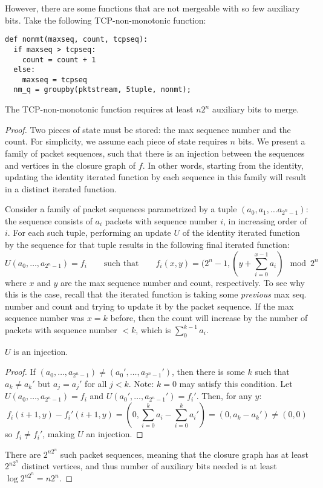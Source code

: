 However, there are some functions that are not mergeable with so few auxiliary bits. Take the following TCP-non-monotonic function:
\begin{verbatim}
def nonmt(maxseq, count, tcpseq):
  if maxseq > tcpseq:
    count = count + 1
  else:
    maxseq = tcpseq
  nm_q = groupby(pktstream, 5tuple, nonmt);
\end{verbatim}

\begin{theorem}
The TCP-non-monotonic function requires at least $n2^n$ auxiliary bits to merge.
\end{theorem}
\begin{proof}
Two pieces of state must be stored: the max sequence number and the count. For simplicity, we assume each piece of state requires $n$ bits.
We present a family of packet sequences, such that there is an injection between the sequences and vertices in the closure graph of $f$. In other words, starting from the identity, updating the identity iterated function by each sequence in this family will result in a distinct iterated function. 

Consider a family of packet sequences parametrized by a tuple $(a_0, a_1, \ldots a_{2^n-1})$: the sequence consists of $a_i$ packets with sequence number $i$, in increasing order of $i$. For each such tuple, performing an update $U$ of the identity iterated function by the sequence for that tuple results in the following final iterated function:
\[ U(a_0, \ldots, a_{2^n-1}) = f_i\quad\quad \text{such that} \quad\quad f_i(x,y) = (2^n - 1, (y + \sum_{i=0}^{x-1} a_i) \mod 2^n \]
where $x$ and $y$ are the max sequence number and count, respectively. To see why this is the case, recall that the iterated function is taking some \emph{previous} max seq. number and count and trying to update it by the packet sequence. If the max sequence number was $x = k$ before, then the count will increase by the number of packets with sequence number $< k$, which is $\sum_0^{k-1} a_i$.
\begin{lemma}
$U$ is an injection.
\end{lemma}
\begin{proof}
If $(a_0, \ldots, a_{2^n-1}) \neq (a_0', \ldots, a_{2^n-1}')$, then there is some $k$ such that $a_k \neq a_k'$ but $a_j = a_j'$ for all $j < k$. Note: $k= 0$ may satisfy this condition. Let $U(a_0, \ldots, a_{2^n-1}) = f_i$ and $U(a_0', \ldots, a_{2^n-1}') = f_i'$. Then, for any $y$:
\[ f_i(i+1, y) - f_i'(i+1,y) = \left(0, \sum_{i = 0}^k a_i - \sum_{i = 0}^k a_i'\right) = (0, a_k - a_k') \neq (0, 0) \]
so $f_i \neq f_i'$, making $U$ an injection.
\end{proof}
There are $2^{n2^n}$ such packet sequences, meaning that the closure graph has at least $2^{n2^n}$ distinct vertices, and thus number of auxiliary bits needed is at least $\log 2^{n2^n} = n2^n$. 
\end{proof}

